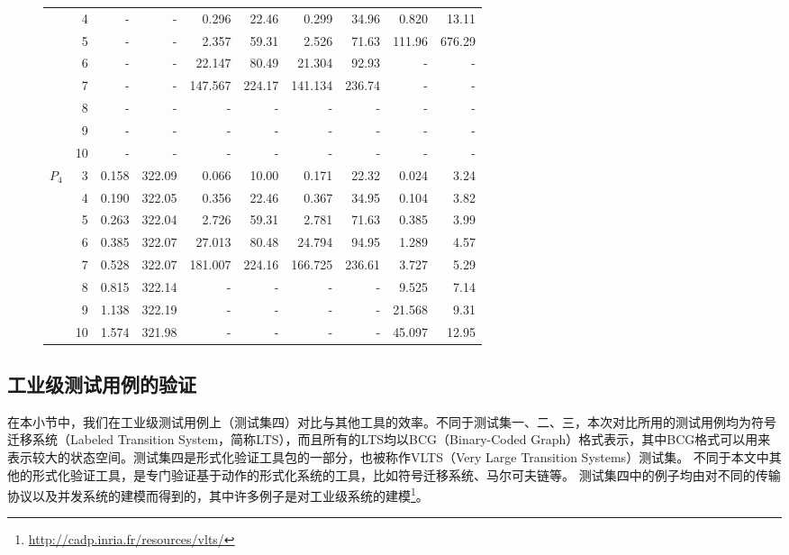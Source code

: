 \begin{figure}[h!]
\begin{tabular}{| r | r | r | r | r | r | r | r | r | r |}
		{} & 4 & - & - & 0.296 & 22.46 & 0.299 & 34.96 & 0.820 & 13.11  \\
		{} & 5 & - & - & 2.357 & 59.31 & 2.526 & 71.63 & 111.96 & 676.29  \\
		{} & 6 & - & - & 22.147 & 80.49 & 21.304 & 92.93 & - & -  \\
		{} & 7 & - & - & 147.567 & 224.17 & 141.134 & 236.74 & - & -  \\
		{} & 8 & - & - & - & - & - & - & - & -  \\
		{} & 9 & - & - & - & - & - & - & - & -  \\
		{} & 10 & - & - & - & - & - & - & - & -  \\
		\hline
		\multirow{6}{*}{$P_4$} & 3 & 0.158 & 322.09 & 0.066 & 10.00 & 0.171 & 22.32 & 0.024 & 3.24  \\
		{} & 4 & 0.190 & 322.05 & 0.356 & 22.46 & 0.367 & 34.95 & 0.104 & 3.82  \\
		{} & 5 & 0.263 & 322.04 & 2.726 & 59.31 & 2.781 & 71.63 & 0.385 & 3.99  \\
		{} & 6 & 0.385 & 322.07 & 27.013 & 80.48 & 24.794 & 94.95 & 1.289 & 4.57  \\
		{} & 7 & 0.528 & 322.07 & 181.007 & 224.16 & 166.725 & 236.61 & 3.727 & 5.29  \\
		{} & 8 & 0.815 & 322.14 & - & - & - & - & 9.525 & 7.14  \\
		{} & 9 & 1.138 & 322.19 & - & - & - & - & 21.568 & 9.31  \\
		{} & 10 & 1.574 & 321.98 & - & - & - & - & 45.097 & 12.95  \\
		\hline
	\end{tabular}
	
	\label{tabl:data:ring}
\end{figure}

\subsection{工业级测试用例的验证}	\label{subsc:vlts}
在本小节中，我们在工业级测试用例上（测试集四）对比\sctl{}与其他工具的效率。不同于测试集一、二、三，本次对比所用的测试用例均为符号迁移系统（Labeled Transition System，简称\textsf{LTS}），而且所有的\textsf{LTS}均以\textsf{BCG}（Binary-Coded Graph）格式表示，其中\textsf{BCG}格式可以用来表示较大的状态空间。测试集四是形式化验证工具包\CADP{}\cite{GaravelLMS13}的一部分，也被称作\textsf{VLTS}（Very Large Transition Systems）测试集。
不同于本文中其他的形式化验证工具，\CADP{}是专门验证基于动作的形式化系统的工具，比如符号迁移系统、马尔可夫链等。
测试集四中的例子均由对不同的传输协议以及并发系统的建模而得到的，其中许多例子是对工业级系统的建模\footnote{\url{http://cadp.inria.fr/resources/vlts/}}。

